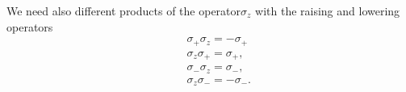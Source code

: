 We need also different products of the operator$\sigma_z$  with the  raising and lowering operators
\begin{eqnarray}
\label{eq:pmzs}
  &&\sigma_+ \sigma_z = -\sigma_+ \\
  &&\sigma_z \sigma_+ = \sigma_+, \\
  &&\sigma_- \sigma_z = \sigma_-, \\
  &&\sigma_z \sigma_- = -\sigma_-. \\
\end{eqnarray}







